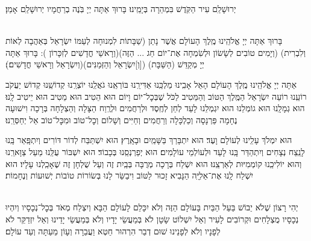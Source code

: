 \documentclass[twoside, openany, parskip=half, 11pt]{book}
\begin{document}
יְרוּשָׁלַ‍ִם עִיר הַקֹּֽדֶשׁ בִּמְהֵרָה בְּיָמֵֽינוּ׃ בָּרוּךְ אַתָּה יְיָ בֹּֽנֶה בְרַחֲמָיו יְרוּשָׁלַ‍ִם אָמֵן׃

\begin{sometimes}

\\
בָּרוּךְ אַתָּה יְיָ אֱלֹהֵֽינוּ מֶֽלֶךְ הָעוֹלָם אֲשֶׁר נָתַן (שַׁבָּתוֹת לִמְנוּחָה לְעַמּוֹ יִשְׂרָאֵל בְּאַהֲבָה לְאוֹת וְלִבְרִית)
(וְיָמִים טוֹבִים לְשָׂשׂוֹן וּלְשִׂמְחָה אֶת־יוֹם חַג ... הַזֶּה)(וְרָאשֵׁי חֳדָשִׁים לְזִכָּרוֹן ):
בָּרוּךְ אַתָּה יְיָ מְקַדֵּשׁ (הַשַּׁבָּת) ([וְ]יִשְׂרָאֵל וְהַזְּמַנִּים)(וְיִשְׂרָאֵל וְרָאשֵׁי חֳדָשִׁים׃)׃

\end{sometimes}


אַתָּה יְיָ אֱלֹהֵֽינוּ מֶֽלֶךְ הָעוֹלָם הָאֵל אָבִֽינוּ מַלְכֵּֽנוּ אַדִּירֵֽנוּ בּוֹרְאֵֽנוּ גֹאֲלֵֽנוּ יוֹצְרֵֽנוּ קְדוֹשֵֽׁנוּ קְדוֹשׁ יַעֲקֹב רוֹעֵֽנוּ רוֹעֵה יִשְׂרָאֵל הַמֶּֽלֶךְ הַטּוֹב וְהַמֵּטִיב לַכֹּל שֶׁבְּכׇל־יוֹם וָיוֹם הוּא הֵטִיב הוּא מֵטִיב הוּא יֵיטִיב לָֽנוּ׃ הוּא גְמָלָֽנוּ הוּא גוֹמְלֵנוּ הוּא יִגְמְלֵנוּ לָעַד לְחֵן לְחֶֽסֶד וּלְרַחֲמִים וּלְרֶֽוַח הַצָּלָה וְהַצְלָחָה בְּרָכָה וִישׁוּעָה נֶחָמָה פַּרְנָסָה וְכַלְכָּלָה וְרַחֲמִים וְחַיִּים וְשָׁלוֹם וְכׇל־טוֹב וּמִכׇּל־טוֹב אַל יְחַסְּרֵֽנוּ׃

הוּא יִמְלֹךְ עָלֵֽינוּ לְעוֹלָם וָעֶד׃
הוּא יִתְבָּרַךְ בַּשָּׁמַֽיִם וּבָאָֽרֶץ׃
הוּא יִשְׁתַּבַּח לְדוֹר דּוֹרִים וְיִתְפָּֽאַר בָּֽנוּ לָנֵֽצַח נְצָחִים
וְיִתְהַדַּר בָּֽנוּ לָעַד וּלְעוֹלְמֵי עוֹלָמִים׃
הוּא יְפַרְנְסֵֽנוּ בְּכָבוֹד׃
הוּא יִשְׁבּוֹר עֻלֵּֽנוּ מֵעַל צַוָּארֵֽנוּ וְהוּא יוֹלִיכֵֽנוּ קוֹמְמִיּוּת לְאַרְצֵֽנוּ׃
הוּא יִשְׁלַח בְּרָכָה מְרֻבָּה בְּבַֽיִת זֶה וְעַל שֻׁלְחָן זֶה שֶׁאָכַֽלְנוּ עָלָיו׃
הוּא יִשְׁלַח לָֽנוּ אֶת־אֵלִיָּֽה הַנָּבִיא זָכוּר לַטּוֹב וִיבַשֵּׂר לָנוּ בְּשׂוֹרוֹת טוֹבוֹת יְשׁוּעוֹת וְנֶחָמוֹת׃


\begin{footnotesize}
\\
יְהִי רָצוֹן שֶׁלֹא יֵבוֹשׁ בַּעַל הַבַּיִת בָּעוֹלָם הַזֶּה וְלֹא יִכָּלֵם לָעוֹלָם הַבָּא וְיִצְלַח מְאֹד בְּכׇל־נְכָסָיו וְיִהְיוּ נְכָסָיו מֻצְלָחִים וּקְרוֹבִים לָעִיר וְאַל יִשְׁלוֹט שָׂטָן לֹא בְּמַעֲשֵׂי יָדָיו וְלֹא בְּמַעֲשֵׂי יָדֵינוּ וְאַל יִזְדַקֵּר לֹא לְפָנָיו וְלֹא לְפָנֵינוּ שׁוּם דְבַר הִרְהוּר חֵטְא וַעֲבֵרָה וְעָוֹן מֵעַתָּה וְעַד עוֹלָם׃

\end{footnotesize}
\end{document}

